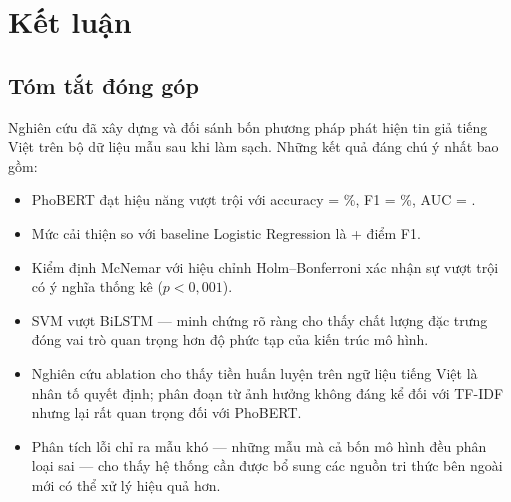 %
%

\chapter*{Kết luận}

\section*{Tóm tắt đóng góp}

Nghiên cứu đã xây dựng và đối sánh bốn phương pháp phát hiện tin giả tiếng Việt trên bộ dữ liệu \nclean{} mẫu sau khi làm sạch. Những kết quả đáng chú ý nhất bao gồm:

\begin{itemize}[leftmargin=2em]
  \item PhoBERT đạt hiệu năng vượt trội với accuracy = \phobertacc\%, F1 = \phobertfone\%, AUC = \phobertaUC.
  \item Mức cải thiện so với baseline Logistic Regression là +\deltalR{} điểm F1.
  \item Kiểm định McNemar với hiệu chỉnh Holm--Bonferroni xác nhận sự vượt trội có ý nghĩa thống kê ($p < 0{,}001$).
  \item SVM vượt BiLSTM --- minh chứng rõ ràng cho thấy chất lượng đặc trưng đóng vai trò quan trọng hơn độ phức tạp của kiến trúc mô hình.
  \item Nghiên cứu ablation cho thấy tiền huấn luyện trên ngữ liệu tiếng Việt là nhân tố quyết định; phân đoạn từ ảnh hưởng không đáng kể đối với TF-IDF nhưng lại rất quan trọng đối với PhoBERT.
  \item Phân tích lỗi chỉ ra \nhardexamples{} mẫu khó --- những mẫu mà cả bốn mô hình đều phân loại sai --- cho thấy hệ thống cần được bổ sung các nguồn tri thức bên ngoài mới có thể xử lý hiệu quả hơn.
\end{itemize}

